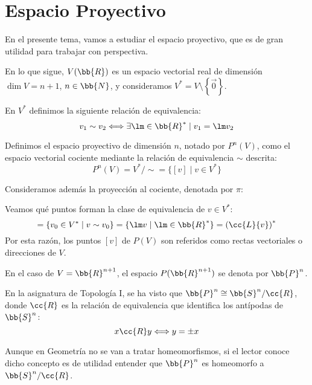 \chapter{Espacio Proyectivo}

En el presente tema, vamos a estudiar el espacio proyectivo, que es de gran utilidad para trabajar con perspectiva.

En lo que sigue, $V(\bb{R})$ es un espacio vectorial real de dimensión $\dim V = n+1$, $n\in \bb{N}$, y consideramos $V^\ast = V\setminus \left\{\vec{0}\right\}$.

\begin{definicion}
    En $V^\ast$ definimos la siguiente relación de equivalencia:
    \begin{equation*}
        v_1 \sim v_2 \Longleftrightarrow \exists \lm \in \bb{R}^\ast \mid v_1=\lm v_2
    \end{equation*}
    
    Definimos el espacio proyectivo de dimensión $n$, notado por $P^n(V)$, como el espacio vectorial cociente mediante la relación de equivalencia $\sim$ descrita:
    \begin{equation*}
        P^n(V) = V^\ast/\sim = \{[v]\mid v\in V^\ast\}
    \end{equation*}

    Consideramos además la proyección al cociente, denotada por $\pi$:
\end{definicion}

Veamos qué puntos forman la clase de equivalencia de $v\in V^\ast$:
\begin{equation*}
    [v] = \{v_0\in V^\ast \mid v\sim v_0\} = \{\lm v \mid \lm \in \bb{R}^\ast\} = \left(\cc{L}\{v\}\right)^\ast
\end{equation*}
Por esta razón, los puntos $[v]$ de $P(V)$ son referidos como rectas vectoriales o direcciones de $V$.


\begin{notacion}
    En el caso de $V=\bb{R}^{n+1}$, el espacio $P(\bb{R}^{n+1})$ se denota por $\bb{P}^n$.
\end{notacion}
\begin{observacion}
    En la asignatura de Topología I, se ha visto que $\bb{P}^n \cong \bb{S}^n/\cc{R}$, donde $\cc{R}$ es la relación de equivalencia que identifica los antípodas de $\bb{S}^n$:
    \begin{equation*}
        x \cc{R} y \Longleftrightarrow y = \pm x
    \end{equation*}

    Aunque en Geometría no se van a tratar homeomorfismos, si el lector conoce dicho concepto es de utilidad entender que $\bb{P}^n$ es homeomorfo a $\bb{S}^n/\cc{R}$.
\end{observacion}


